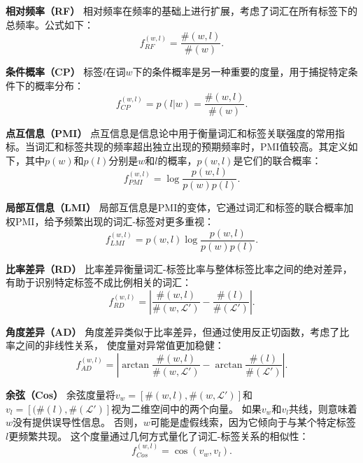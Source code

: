 \textbf{相对频率（RF）}
相对频率在频率的基础上进行扩展，考虑了词汇在所有标签下的总频率。公式如下：
\begin{equation}
f_{RF}^{(w,l)} = \frac{\#(w, l)}{\#(w)}.
\end{equation}

\textbf{条件概率（CP）}
标签\(l\)在词\(w\)下的条件概率是另一种重要的度量，用于捕捉特定条件下的概率分布：
\begin{equation}
f_{CP}^{(w,l)} = p(l|w) = \frac{\#(w, l)}{\#(w)}.
\end{equation}

\textbf{点互信息（PMI）}
点互信息是信息论中用于衡量词汇和标签关联强度的常用指标。当词汇和标签共现的频率超出独立出现的预期频率时，PMI值较高。其定义如下，其中\(p(w)\)和\(p(l)\)分别是\(w\)和\(l\)的概率，\(p(w,l)\)是它们的联合概率：
\begin{equation}
f_{PMI}^{(w,l)} = \log \frac{p(w,l)}{p(w)p(l)}.
\end{equation}

\textbf{局部互信息（LMI）}
局部互信息是PMI的变体，它通过词汇和标签的联合概率加权PMI，给予频繁出现的词汇-标签对更多重视：
\begin{equation}
f_{LMI}^{(w,l)} = p(w, l)\log \frac{p(w,l)}{p(w)p(l)}.
\end{equation}

\textbf{比率差异（RD）}
比率差异衡量词汇-标签比率与整体标签比率之间的绝对差异，有助于识别特定标签不成比例相关的词汇：
\begin{equation}
f_{RD}^{(w,l)} = \left|\frac{\#(w, l)}{\#(w, \mathcal{L'})} - \frac{\#(l)}{\#(\mathcal{L'})}\right|.
\end{equation}

\textbf{角度差异（AD）}
角度差异类似于比率差异，但通过使用反正切函数，考虑了比率之间的非线性关系，
使度量对异常值更加稳健：
\begin{equation}
f_{AD}^{(w,l)} = \left| \arctan\frac{\#(w, l)}{\#(w, \mathcal{L'})} - \arctan \frac{\#(l)}{\#(\mathcal{L'})} \right|.
\end{equation}

\textbf{余弦（Cos）}
余弦度量将\(v_w=[\#(w, l), \#(w, \mathcal{L'})]\)和\(v_l = [(\#(l), \#(\mathcal{L'})]\)视为二维空间中的两个向量。
如果\(v_w\)和\(v_l\)共线，则意味着\(w\)没有提供误导性信息。
否则，\(w\)可能是虚假线索，因为它倾向于与某个特定标签\(l\)更频繁共现。
这个度量通过几何方式量化了词汇-标签关系的相似性：
\begin{equation}
f_{Cos}^{(w,l)} = \cos(v_w, v_l).
\end{equation}

